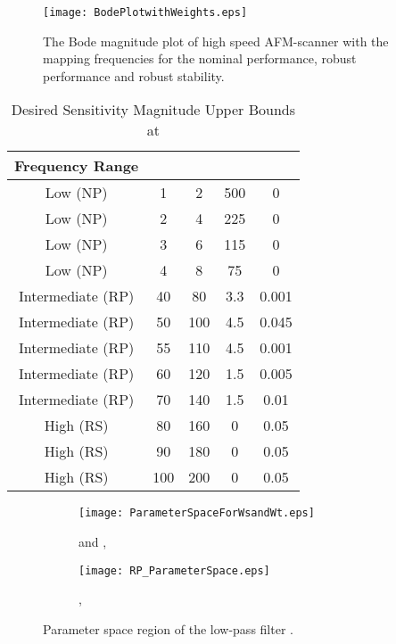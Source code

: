 \documentclass[12pt,draftcls,onecolumn]{IEEEtran}
\begin{document}
\begin{figure}\centering
    \texttt{[image: BodePlotwithWeights.eps]}\\
    \caption{The Bode magnitude plot of high speed AFM-scanner with the mapping
    frequencies for the nominal performance, robust performance and robust stability.}\end{figure}


\begin{table}[!t]
\renewcommand{\arraystretch}{1.3}
\caption{Desired Sensitivity Magnitude Upper Bounds at
} \label{table_example} \centering
\begin{tabular}{c||c||c||c||c}
\hline
\bfseries Frequency Range & \bfseries  & \bfseries  &  & \\
\hline\hline
Low (NP) & 1 & 2 & 500 & 0\\
\hline
Low (NP) & 2 & 4 & 225 & 0\\
\hline
Low (NP) & 3 & 6 & 115 & 0\\
\hline
Low (NP) & 4 & 8 &  75 & 0\\
\hline
Intermediate (RP) & 40 &  80 & 3.3 & 0.001\\
\hline
Intermediate (RP) & 50 & 100 & 4.5 & 0.045\\
\hline
Intermediate (RP) & 55 & 110 & 4.5 & 0.001\\
\hline
Intermediate (RP) & 60 & 120 & 1.5 & 0.005\\
\hline
Intermediate (RP) & 70 & 140 & 1.5 &  0.01\\
\hline
High (RS) &  80 & 160 & 0 & 0.05\\
\hline
High (RS) &  90 & 180 & 0 & 0.05\\
\hline
High (RS) & 100 & 200 & 0 & 0.05\\
\hline
\end{tabular}
\end{table}


\begin{figure}
        \centering
        \begin{subfigure}[b]{0.5\textwidth}
                \texttt{[image: ParameterSpaceForWsandWt.eps]}
                \caption{ and , }
                \label{fig:gull}
        \end{subfigure}\begin{subfigure}[b]{0.5\textwidth}
                \texttt{[image: RP\_ParameterSpace.eps]}
                \caption{, }
                \label{fig:tiger}
        \end{subfigure}
        \caption{Parameter space region of the low-pass filter .}\label{fig:animals}
\end{figure}
\end{document}
